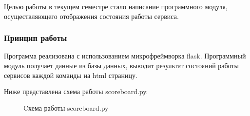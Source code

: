 Целью работы в текущем семестре стало написание программного модуля, осуществляющего отображения состояния работы сервиса.

\subsubsection{Принцип работы}

Программа реализована с использованием микрофреймворка flask. Программный модуль получает данные из базы данных, выводит результат состояний работы сервисов каждой команды на html страницу.

Ниже представлена схема работы scoreboard.py.

\begin{figure}[ht!]
\caption{Cхема работы scoreboard.py}
\end{figure}

\clearpage